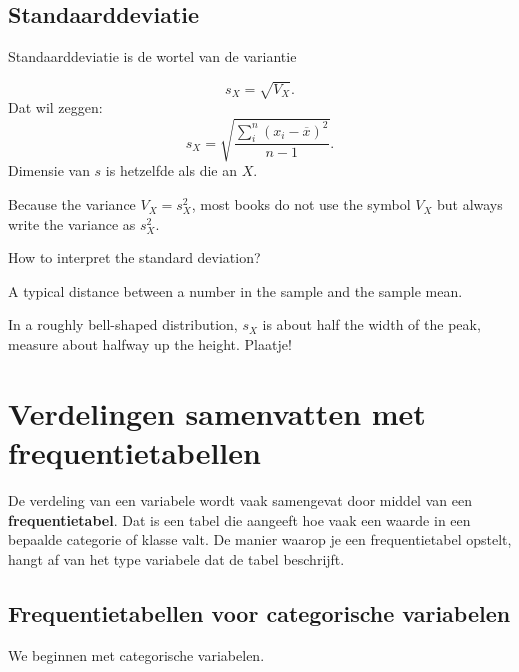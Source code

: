 \documentclass[
  a4paper,
]{scrbook}
\theoremstyle{definition}
\theoremstyle{definition}
\theoremstyle{remark}
\begin{document}
\subsection{Standaarddeviatie}\label{standaarddeviatie}

Standaarddeviatie is de wortel van de variantie

\[
s_X = \sqrt{V_X}.
\] Dat wil zeggen: \[
s_X = \sqrt{\frac{\sum_i^n \left(x_i - \overline{x}\right)^2}{n-1}}.
\] Dimensie van \(s\) is hetzelfde als die an \(X\).

Because the variance \(V_X = s_X^2\), most books do not use the symbol
\(V_X\) but always write the variance as \(s_X^2\).

How to interpret the standard deviation?

A typical distance between a number in the sample and the sample mean.

In a roughly bell-shaped distribution, \(s_X\) is about half the width
of the peak, measure about halfway up the height. Plaatje!

\section{Verdelingen samenvatten met
frequentietabellen}\label{verdelingen-samenvatten-met-frequentietabellen}

De verdeling van een variabele wordt vaak samengevat door middel van een
\textbf{frequentietabel}. Dat is een tabel die aangeeft hoe vaak een
waarde in een bepaalde categorie of klasse valt. De manier waarop je een
frequentietabel opstelt, hangt af van het type variabele dat de tabel
beschrijft.

\subsection{Frequentietabellen voor categorische
variabelen}\label{frequentietabellen-voor-categorische-variabelen}

We beginnen met categorische variabelen.
\end{document}
